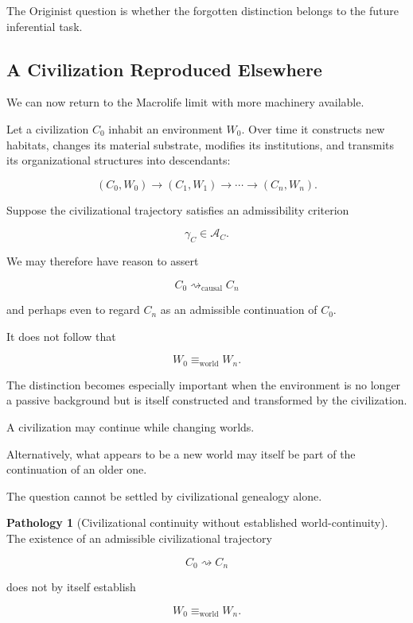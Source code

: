 \documentclass[
  11pt,
  a4paper,
  DIV=12,
  BCOR=0mm,
  parskip=half-
]{scrartcl}
\newcommand{\Adm}{\mathcal A}
\newcommand{\leadcausal}{%
  \mathrel{\rightsquigarrow_{\mathrm{causal}}}%
}
\newcommand{\eqworld}{%
  \equiv_{\mathrm{world}}%
}
\theoremstyle{definition}
\newtheorem{pathology}[definition]{Pathology}
\theoremstyle{plain}
\theoremstyle{remark}
\begin{document}
The Originist question is whether the forgotten distinction belongs to the
future inferential task.


\subsection{A Civilization Reproduced Elsewhere}
\label{sec:civilization-substrate}

We can now return to the Macrolife limit with more machinery available.

Let a civilization \(C_0\) inhabit an environment \(W_0\). Over time it
constructs new habitats, changes its material substrate, modifies its
institutions, and transmits its organizational structures into descendants:

\[
  (C_0,W_0)
  \longrightarrow
  (C_1,W_1)
  \longrightarrow
  \cdots
  \longrightarrow
  (C_n,W_n).
\]

Suppose the civilizational trajectory satisfies an admissibility criterion

\[
  \gamma_C\in\Adm_C.
\]

We may therefore have reason to assert

\[
  C_0\leadcausal C_n
\]

and perhaps even to regard \(C_n\) as an admissible continuation of \(C_0\).

It does not follow that

\[
  W_0\eqworld W_n.
\]

The distinction becomes especially important when the environment is no longer
a passive background but is itself constructed and transformed by the
civilization.

A civilization may continue while changing worlds.

Alternatively, what appears to be a new world may itself be part of the
continuation of an older one.

The question cannot be settled by civilizational genealogy alone.

\begin{pathology}[Civilizational continuity without established world-continuity]
\label{path:civilization-world}
The existence of an admissible civilizational trajectory

\[
  C_0\rightsquigarrow C_n
\]

does not by itself establish

\[
  W_0\eqworld W_n.
\]
\end{pathology}
\end{document}
